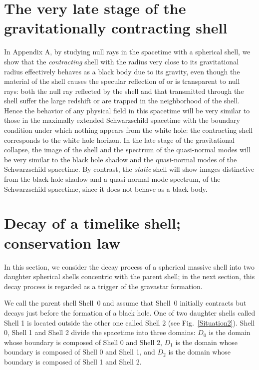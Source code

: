 \documentclass[aps,preprint,preprintnumber,nofootinbib,amsmath,amssymb,ascmac,bm,12pt]{revtex4}
\begin{document}
\section{The very late stage of the gravitationally contracting shell}

In Appendix A, by studying null rays in the spacetime with a 
spherical shell, we show that the {\it contracting} shell with the radius 
very close to its gravitational radius effectively behaves as a black body due to its gravity, 
even though the material of the shell causes the specular reflection of or is transparent to null rays: 
both the null ray reflected by the shell and that transmitted through the shell suffer the large redshift 
or are trapped in the neighborhood of the shell.  
Hence the behavior of any physical field in this spacetime  
will be very similar to those in the maximally extended  
Schwarzschild spacetime with the boundary condition 
under which nothing appears from the white hole: the contracting 
shell corresponds to the white hole horizon. 
In the late stage of the gravitational collapse, the image of the shell 
and the spectrum of the quasi-normal modes will be very similar to 
the black hole shadow and the quasi-normal modes of the 
Schwarzschild spacetime. 
By contrast, the {\it static} shell will show images distinctive from the black hole shadow and 
a  quasi-normal mode spectrum, of the Schwarzschild spacetime, 
since it does not behave as a black body.   



\section{Decay of a timelike shell; conservation law}

In this section, we consider the decay process of a spherical massive shell into two 
daughter spherical shells concentric with the parent shell; in the next section, 
this decay process is regarded as a trigger of the gravastar formation. 

We call the parent shell Shell~0 and assume that Shell~0 initially contracts but 
decays just before the formation of a black hole.  
One of two daughter shells called Shell 1 is located outside the other one called Shell 2 
(see Fig.~\ref{Situation2}). 
Shell 0, Shell 1 and Shell 2 divide the spacetime into three domains: $D_0$ is the domain 
whose boundary is composed of Shell 0 and Shell 2, $D_1$ is the domain 
whose boundary is composed of Shell 0 and Shell 1, and $D_2$ is the 
domain whose boundary is composed of Shell 1 and Shell 2.   
\end{document}
